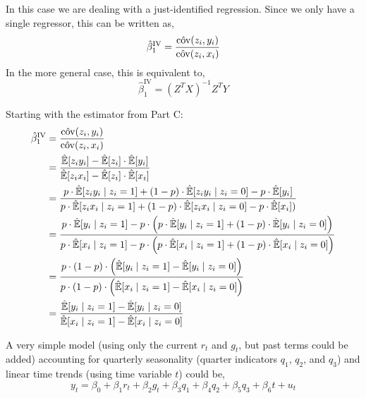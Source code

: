 \documentclass[12pt,twoside]{article}
\begin{document}
\begin{problems}
\begin{problemparts}
\problempart  %

In this case we are dealing with a just-identified regression. Since we only
have a single regressor, this can be written as,
$$ \hat{\beta}_1^{\mathrm{IV}} = \frac{\hat{\operatorname{cov}}(z_i, y_i)}{\hat{\operatorname{cov}}(z_i, x_i)} $$
In the more general case, this is equivalent to,
$$ \hat{\beta}_1^{\mathrm{IV}} = (Z^T X)^{-1} Z^T Y $$

\problempart  %

Starting with the estimator from Part C:
\begin{align*}
    \hat{\beta}_1^{\mathrm{IV}} &= \frac{\hat{\operatorname{cov}}(z_i, y_i)}{\hat{\operatorname{cov}}(z_i, x_i)} \\
    &= \frac{\hat{\mathbb{E}}[z_i y_i] - \hat{\mathbb{E}}[z_i] \cdot
    \hat{\mathbb{E}}[y_i]}{\hat{\mathbb{E}}[z_i x_i] - \hat{\mathbb{E}}[z_i] \cdot
    \hat{\mathbb{E}}[x_i]} \\
    &= \frac{p \cdot \hat{\mathbb{E}}[z_i y_i \mid z_i = 1] + (1 - p) \cdot
    \hat{\mathbb{E}}[z_i y_i \mid z_i = 0] - p \cdot \hat{\mathbb{E}}[y_i]}{p
    \cdot \hat{\mathbb{E}}[z_i x_i \mid z_i = 1] + (1 - p) \cdot
    \hat{\mathbb{E}}[z_i x_i \mid z_i = 0] - p \cdot \hat{\mathbb{E}}[x_i])} \\
    &= \frac{p \cdot \hat{\mathbb{E}}[y_i \mid z_i = 1] - p \cdot \left(p
    \cdot \hat{\mathbb{E}}[y_i \mid z_i = 1] + (1 - p) \cdot
    \hat{\mathbb{E}}[y_i \mid z_i = 0]\right)}{p \cdot \hat{\mathbb{E}}[x_i
    \mid z_i = 1] - p \cdot \left(p \cdot \hat{\mathbb{E}}[x_i \mid z_i = 1]
    + (1 - p) \cdot \hat{\mathbb{E}}[x_i \mid z_i = 0]\right)} \\
    &= \frac{p \cdot (1 - p) \cdot \left(\hat{\mathbb{E}}[y_i \mid z_i = 1] -
    \hat{\mathbb{E}}[y_i \mid z_i = 0]\right)}{p \cdot (1 - p) \cdot
    \left(\hat{\mathbb{E}}[x_i \mid z_i = 1] - \hat{\mathbb{E}}[x_i \mid z_i
    = 0]\right)} \\
    &= \frac{\hat{\mathbb{E}}[y_i \mid z_i = 1] - \hat{\mathbb{E}}[y_i \mid
    z_i = 0]}{\hat{\mathbb{E}}[x_i \mid z_i = 1] - \hat{\mathbb{E}}[x_i \mid
    z_i = 0]}
\end{align*}

\end{problemparts}

\newpage

\problem  %

\begin{problemparts}

\problempart %

A very simple model (using only the current $r_t$ and $g_t$, but past terms
could be added) accounting for quarterly seasonality (quarter indicators
$q_1$, $q_2$, and $q_3$) and linear time trends (using time variable $t$)
could be,
$$ y_t = \beta_0 + \beta_1 r_t + \beta_2 g_t + \beta_3 q_1 + \beta_4 q_2 +
\beta_5 q_3 + \beta_6 t + u_t $$


\end{problemparts}
\end{problems}
\end{document}

